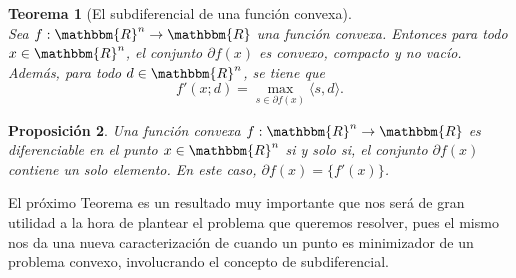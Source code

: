 \documentclass[a4paper,12pt]{report}
\newcommand{\la}{\langle}
\newcommand{\ra}{\rangle}
\newcommand{\RR}{\mathbbm{R}}
\newcommand{\Rn}{\RR^n}
\newcommand{\sdif}{\partial f(x)}
\newcommand{\arr}{\rightarrow}
\newtheorem{teo}{Teorema}[section]
\newtheorem{prop}[teo]{Proposici\'on}
\begin{document}
\begin{teo}[El subdiferencial de una funci\'on convexa]
$\mbox{}$ \\ Sea $f:\Rn\arr\RR$ una funci\'on convexa. Entonces para todo $x\in\Rn$, el conjunto $\sdif$ es convexo, compacto y no vac\'io. Adem\'as, para todo $d\in\Rn$, se tiene que
\begin{equation}\label{subdifconvexa}
f'(x;d)=\max_{s\in\sdif}\la s,d\ra.
\end{equation}
\end{teo}
\begin{prop}
Una funci\'on convexa $f:\Rn\arr\RR$ es diferenciable en el punto $x\in\Rn$ si y solo si, el conjunto $\sdif$ contiene un solo elemento. En este caso, $\sdif=\{f'(x)\}$.
\end{prop}

El pr\'oximo Teorema es un resultado muy importante que nos ser\'a de gran utilidad a la hora de plantear el problema que queremos resolver, pues el mismo nos da una nueva caracterizaci\'on de cuando un punto es minimizador de un problema convexo, involucrando el concepto de subdiferencial.
\end{document}
